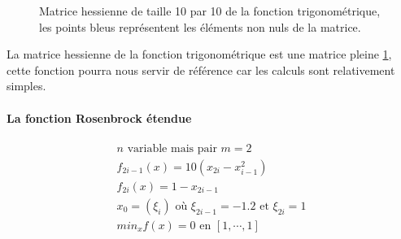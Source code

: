 \begin{figure}
\caption{Matrice hessienne de taille 10 par 10 de la fonction trigonom\'etrique, les points bleus repr\'esentent les \'el\'ements non nuls de la
matrice.}

\begin{center}
\end{center}
\label{fig:trigo}
\end{figure}






La matrice hessienne de la fonction trigonom\'etrique est une matrice pleine \ref{fig:trigo}, cette fonction pourra nous servir 
de r\'ef\'erence car les calculs sont relativement simples.



\paragraph{La fonction Rosenbrock \'etendue}

\begin{align*}
n\text{ variable mais pair } m=2 \\
f_{2i-1}(x)=10(x_{2i}-x^2_{i-1})\\
f_{2i}(x)=1-x_{2i-1}\\
x_0= (\xi_i) \text{ o\`u } \xi_{2i-1}= -1.2  \text{ et } \xi_{2i}=1 \\
min_x f(x) = 0 \text{ en } [1,\cdots ,1]
\end{align*}

